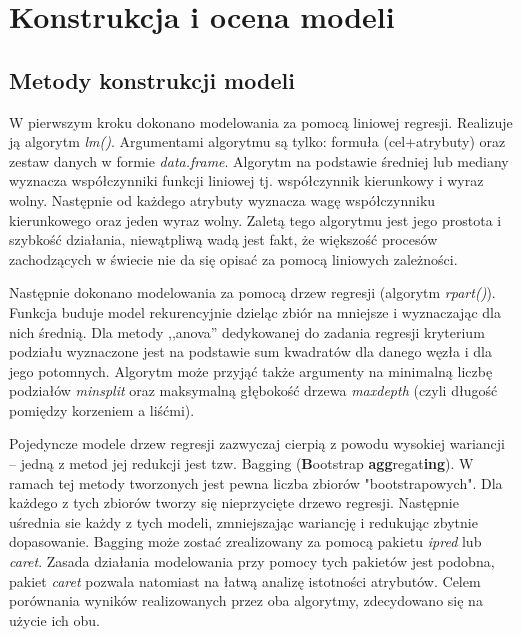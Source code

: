 \documentclass[a4paper,11pt,twoside]{mwrep}  %
\begin{document}
\endgroup

\begingroup
\let\clearpage\relax
\chapter{Konstrukcja i ocena modeli}

\section{Metody konstrukcji modeli}
W pierwszym kroku dokonano modelowania za pomocą liniowej regresji. Realizuje ją algorytm \textit{lm()}. Argumentami algorytmu są tylko: formuła (cel+atrybuty) oraz zestaw danych w formie \textit{data.frame}. Algorytm na podstawie średniej lub mediany wyznacza współczynniki funkcji liniowej tj. współczynnik kierunkowy i wyraz wolny. Następnie od każdego atrybuty wyznacza wagę współczynniku kierunkowego oraz jeden wyraz wolny. Zaletą tego algorytmu jest jego prostota i szybkość działania, niewątpliwą wadą jest fakt, że większość procesów zachodzących w świecie nie da się opisać za pomocą liniowych zależności.
\par 
Następnie dokonano modelowania za pomocą drzew regresji (algorytm \textit{rpart()}). Funkcja buduje model rekurencyjnie dzieląc zbiór na mniejsze i wyznaczając dla nich średnią. Dla metody ,,anova'' dedykowanej do zadania regresji kryterium podziału wyznaczone jest na podstawie sum kwadratów dla danego węzła i dla jego potomnych. Algorytm może przyjąć także argumenty na minimalną liczbę podziałów \textit{minsplit} oraz maksymalną głębokość drzewa \textit{maxdepth} (czyli długość pomiędzy korzeniem a liśćmi).
\par
Pojedyncze modele drzew regresji zazwyczaj cierpią z powodu wysokiej wariancji -- jedną z metod jej redukcji jest tzw. Bagging (\textbf{B}ootstrap \textbf{agg}regat\textbf{ing}). W ramach tej metody tworzonych jest pewna liczba zbiorów "bootstrapowych". Dla każdego z tych zbiorów tworzy się nieprzycięte drzewo regresji. Następnie uśrednia sie każdy z tych modeli, zmniejszając wariancję i redukując zbytnie dopasowanie. Bagging może zostać zrealizowany za pomocą pakietu \textit{ipred} lub \textit{caret}. Zasada działania modelowania przy pomocy tych pakietów jest podobna, pakiet \textit{caret} pozwala natomiast na łatwą analizę istotności atrybutów. Celem porównania wyników realizowanych przez oba algorytmy, zdecydowano się na użycie ich obu.
\par
\end{document}
